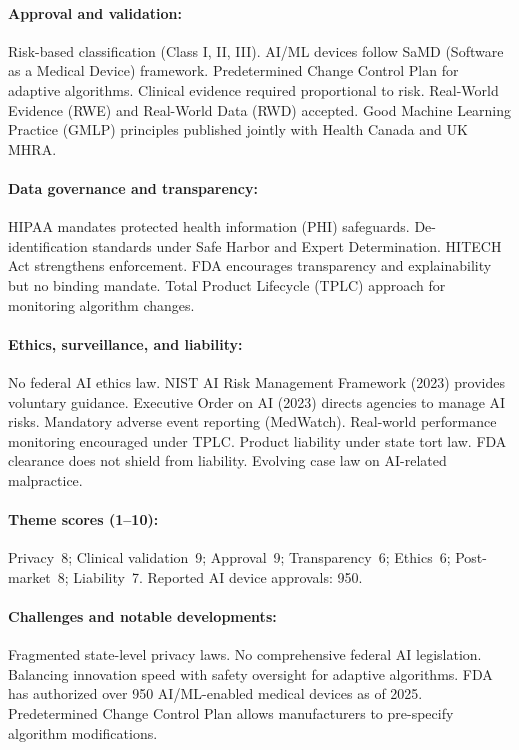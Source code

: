 {\paragraph{Approval and validation:}
Risk-based classification (Class I, II, III). AI/ML devices follow SaMD (Software as a Medical Device) framework. Predetermined Change Control Plan for adaptive algorithms.
Clinical evidence required proportional to risk. Real-World Evidence (RWE) and Real-World Data (RWD) accepted. Good Machine Learning Practice (GMLP) principles published jointly with Health Canada and UK MHRA.

\paragraph{Data governance and transparency:}
HIPAA mandates protected health information (PHI) safeguards. De-identification standards under Safe Harbor and Expert Determination. HITECH Act strengthens enforcement.
FDA encourages transparency and explainability but no binding mandate. Total Product Lifecycle (TPLC) approach for monitoring algorithm changes.

\paragraph{Ethics, surveillance, and liability:}
No federal AI ethics law. NIST AI Risk Management Framework (2023) provides voluntary guidance. Executive Order on AI (2023) directs agencies to manage AI risks.
Mandatory adverse event reporting (MedWatch). Real-world performance monitoring encouraged under TPLC.
Product liability under state tort law. FDA clearance does not shield from liability. Evolving case law on AI-related malpractice.

\paragraph{Theme scores (1--10):}
Privacy~8;
Clinical validation~9;
Approval~9;
Transparency~6;
Ethics~6;
Post-market~8;
Liability~7.
Reported AI device approvals: 950.

\paragraph{Challenges and notable developments:}
Fragmented state-level privacy laws. No comprehensive federal AI legislation. Balancing innovation speed with safety oversight for adaptive algorithms.
FDA has authorized over 950 AI/ML-enabled medical devices as of 2025. Predetermined Change Control Plan allows manufacturers to pre-specify algorithm modifications.


}
